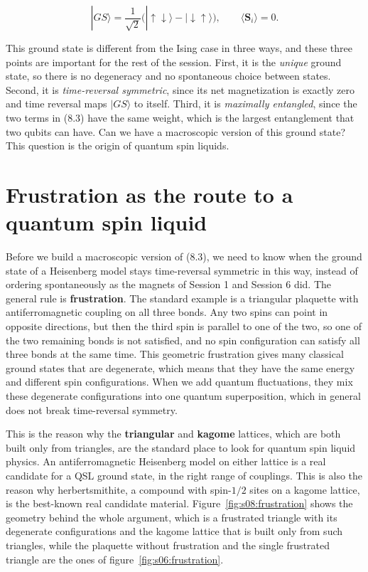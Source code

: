 \begin{equation}
|GS\rangle = \frac{1}{\sqrt2}\Big(|{\uparrow\downarrow}\rangle -
|{\downarrow\uparrow}\rangle\Big), \qquad \langle \mathbf S_i \rangle = 0.
\end{equation}

This ground state is different from the Ising case in three ways, and these three points are
important for the rest of the session. First, it is the \emph{unique} ground state, so there is no
degeneracy and no spontaneous choice between states. Second, it is \emph{time-reversal symmetric},
since its net magnetization is exactly zero and time reversal maps $|GS\rangle$ to itself. Third,
it is \emph{maximally entangled}, since the two terms in (8.3) have the same weight, which is the
largest entanglement that two qubits can have. Can we have a macroscopic version of this ground
state? This question is the origin of quantum spin liquids.

\section{Frustration as the route to a quantum spin liquid}

Before we build a macroscopic version of (8.3), we need to know when the ground state of a
Heisenberg model stays time-reversal symmetric in this way, instead of ordering spontaneously as
the magnets of Session 1 and Session 6 did. The general rule is \textbf{frustration}. The standard
example is a triangular plaquette with antiferromagnetic coupling on all three bonds. Any two spins
can point in opposite directions, but then the third spin is parallel to one of the two, so one of the two
remaining bonds is not satisfied, and no spin configuration can satisfy all three bonds at the same time.
This geometric frustration gives many classical ground states that are degenerate, which means that
they have the same energy and different spin configurations. When we add quantum fluctuations, they
mix these degenerate configurations into one quantum superposition, which in general does not break
time-reversal symmetry.

This is the reason why the \textbf{triangular} and \textbf{kagome} lattices, which are both built
only from triangles, are the standard place to look for quantum spin liquid physics. An
antiferromagnetic Heisenberg model on either lattice is a real candidate for a QSL ground state, in
the right range of couplings. This is also the reason why herbertsmithite, a compound with
spin-$1/2$ sites on a kagome lattice, is the best-known real candidate material.
Figure~\ref{fig:s08:frustration} shows the geometry behind the whole argument, which is a frustrated
triangle with its degenerate configurations and the kagome lattice that is built only from such
triangles, while the plaquette without frustration and the single frustrated triangle are the ones
of figure~\ref{fig:s06:frustration}.

